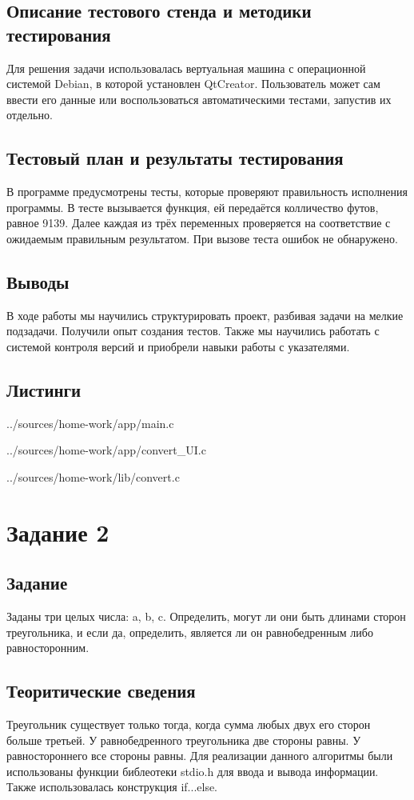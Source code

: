 \documentclass[12pt,a4paper]{report}
\begin{document}
\subsection{Описание тестового стенда и методики тестирования}
Для решения задачи использовалась вертуальная машина с операционной системой Debian, в которой установлен QtCreator. 
Пользователь может сам ввести его данные или воспользоваться автоматическими тестами, запустив их отдельно.
\subsection{Тестовый план и результаты тестирования}
В программе предусмотрены тесты, которые проверяют правильность исполнения программы. В тесте вызывается функция, ей передаётся колличество футов, равное 9139. Далее каждая из трёх переменных проверяется на соответствие с ожидаемым правильным результатом. При вызове теста ошибок не обнаружено.
\subsection{Выводы}
В ходе работы мы научились структурировать проект, разбивая задачи на мелкие подзадачи. Получили опыт создания тестов. Также мы научились работать с системой контроля версий и приобрели навыки работы с указателями.
\subsection*{Листинги}

{../sources/home-work/app/main.c}


{../sources/home-work/app/convert_UI.c}


{../sources/home-work/lib/convert.c}


\section{Задание 2}
\subsection{Задание}
Заданы три целых числа: a, b, c. Определить, могут ли они быть длинами сторон треугольника, и если да, определить, является ли он равнобедренным либо равносторонним.
\subsection{Теоритические сведения}
Треугольник существует только тогда, когда сумма любых двух его сторон больше третьей. У равнобедренного треугольника две стороны равны. У равностороннего все стороны равны.
Для реализации данного алгоритмы были использованы функции библеотеки stdio.h для ввода и вывода информации. Также использовалась конструкция if...else. 
\end{document}
